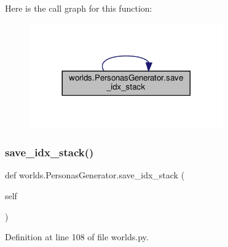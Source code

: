 Here is the call graph for this function\+:
\nopagebreak
\begin{figure}[H]
\begin{center}
\leavevmode
\includegraphics[width=236pt]{classworlds_1_1PersonasGenerator_a5a71b02bc024659c63d0f5416de64fe8_cgraph}
\end{center}
\end{figure}
\mbox{\label{classworlds_1_1PersonasGenerator_a5a71b02bc024659c63d0f5416de64fe8}} 
\subsubsection{\texorpdfstring{save\+\_\+idx\+\_\+stack()}{save\_idx\_stack()}\hspace{0.1cm}{\footnotesize\ttfamily [2/2]}}
{\footnotesize\ttfamily def worlds.\+Personas\+Generator.\+save\+\_\+idx\+\_\+stack (\begin{DoxyParamCaption}\item[{}]{self }\end{DoxyParamCaption})}



Definition at line 108 of file worlds.\+py.



